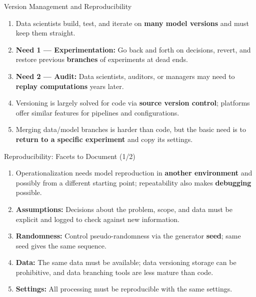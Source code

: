 \begin{frame}{Version Management and Reproducibility}
\begin{enumerate}
\item<1-> Data scientists build, test, and iterate on \textbf{many model versions} and must keep them straight.
\item<2-> \textbf{Need 1 --- Experimentation:} Go back and forth on decisions, revert, and restore previous \textbf{branches} of experiments at dead ends.
\item<3-> \textbf{Need 2 --- Audit:} Data scientists, auditors, or managers may need to \textbf{replay computations} years later.
\item<4-> Versioning is largely solved for code via \textbf{source version control}; platforms offer similar features for pipelines and configurations.
\item<5-> Merging data/model branches is harder than code, but the basic need is to \textbf{return to a specific experiment} and copy its settings.
\end{enumerate}
\end{frame}

\begin{frame}{Reproducibility: Facets to Document (1/2)}
\begin{enumerate}
\item<1-> Operationalization needs model reproduction in \textbf{another environment} and possibly from a different starting point; repeatability also makes \textbf{debugging} possible.
\item<2-> \textbf{Assumptions:} Decisions about the problem, scope, and data must be explicit and logged to check against new information.
\item<3-> \textbf{Randomness:} Control pseudo-randomness via the generator \textbf{seed}; same seed gives the same sequence.
\item<4-> \textbf{Data:} The same data must be available; data versioning storage can be prohibitive, and data branching tools are less mature than code.
\item<5-> \textbf{Settings:} All processing must be reproducible with the same settings.
\end{enumerate}
\end{frame}

